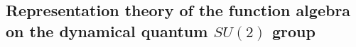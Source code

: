 





\subsection{Representation theory of the function algebra on the dynamical quantum $SU(2)$ group}



